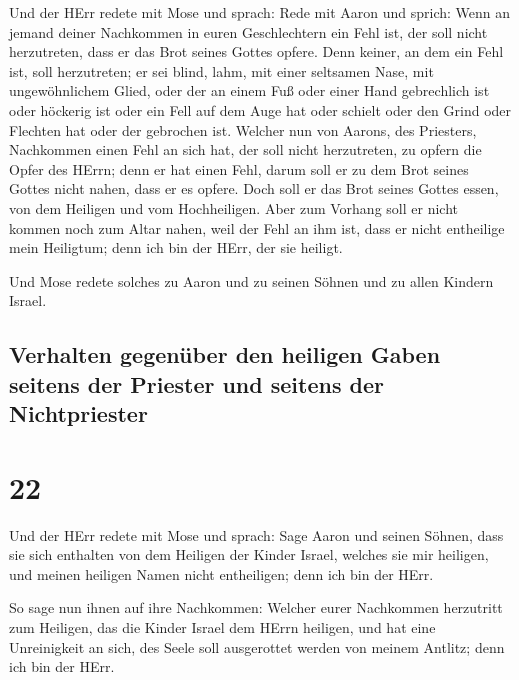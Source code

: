  Und der HErr redete mit Mose und sprach: 
Rede mit Aaron und sprich: Wenn an jemand deiner Nachkommen in euren
Geschlechtern ein Fehl ist, der soll nicht herzutreten, dass er das Brot
seines Gottes opfere.  Denn keiner, an dem ein Fehl ist,
soll herzutreten; er sei blind, lahm, mit einer seltsamen Nase, mit
ungewöhnlichem Glied,  oder der an einem Fuß oder einer
Hand gebrechlich ist  oder höckerig ist oder ein Fell auf
dem Auge hat oder schielt oder den Grind oder Flechten hat oder der
gebrochen ist.  Welcher nun von Aarons, des Priesters,
Nachkommen einen Fehl an sich hat, der soll nicht herzutreten, zu opfern
die Opfer des HErrn; denn er hat einen Fehl, darum soll er zu dem Brot
seines Gottes nicht nahen, dass er es opfere.  Doch soll
er das Brot seines Gottes essen, von dem Heiligen und vom Hochheiligen.
 Aber zum Vorhang soll er nicht kommen noch zum Altar
nahen, weil der Fehl an ihm ist, dass er nicht entheilige mein
Heiligtum; denn ich bin der HErr, der sie heiligt.

 Und Mose redete solches zu Aaron und zu seinen Söhnen
und zu allen Kindern Israel.

\hypertarget{verhalten-gegenuxfcber-den-heiligen-gaben-seitens-der-priester-und-seitens-der-nichtpriester}{%
\subsection{Verhalten gegenüber den heiligen Gaben seitens der Priester
und seitens der
Nichtpriester}\label{verhalten-gegenuxfcber-den-heiligen-gaben-seitens-der-priester-und-seitens-der-nichtpriester}}

\hypertarget{section-21}{%
\section{22}\label{section-21}}

 Und der HErr redete mit Mose und sprach: 
Sage Aaron und seinen Söhnen, dass sie sich enthalten von dem Heiligen
der Kinder Israel, welches sie mir heiligen, und meinen heiligen Namen
nicht entheiligen; denn ich bin der HErr.

 So sage nun ihnen auf ihre Nachkommen: Welcher eurer
Nachkommen herzutritt zum Heiligen, das die Kinder Israel dem HErrn
heiligen, und hat eine Unreinigkeit an sich, des Seele soll ausgerottet
werden von meinem Antlitz; denn ich bin der HErr.

